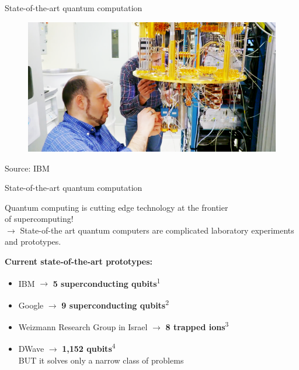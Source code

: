 \documentclass[10pt]{beamer}
\begin{document}
{
\begin{frame}[fragile]{State-of-the-art quantum computation}
\begin{figure}
\includegraphics[scale=0.42]{ibm_fridge.png}
\end{figure}
\centering
\tiny{Source: IBM}

\end{frame}
}
{
\begin{frame}[fragile]{State-of-the-art quantum computation}

Quantum computing is cutting edge technology at the frontier\\ of supercomputing!\\
\vspace{0.1cm}
$\rightarrow$ State-of-the art quantum computers are complicated laboratory experiments and prototypes.

\vspace{0.3cm}
\textbf{Current state-of-the-art prototypes:}\\
\begin{itemize}
\item IBM $\rightarrow$ \textbf{5 superconducting qubits}\textsuperscript{1}
\item Google $\rightarrow$ \textbf{9 superconducting qubits}\textsuperscript{2}
\item Weizmann Research Group in Israel $\rightarrow$ \textbf{8 trapped ions}\textsuperscript{3}
\item DWave $\rightarrow$ \textbf{1,152 qubits}\textsuperscript{4}\\
BUT it solves only a narrow class of problems
\end{itemize}

\end{frame}
}
\end{document}
